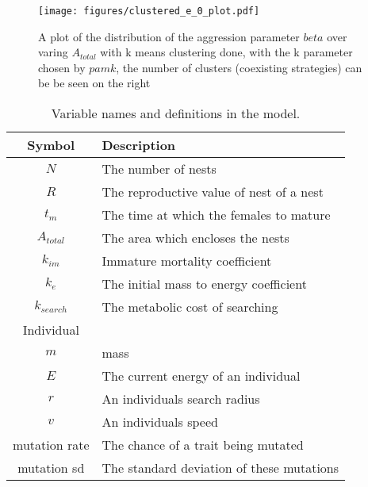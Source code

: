 \documentclass[a4paper,11pt]{article}
\begin{document}
\begin{figure}[h!]
    \centering
    \texttt{[image: figures/clustered\_e\_0\_plot.pdf]}
    \caption{A plot of the distribution of the aggression parameter $beta$ over varing $A_{total}$ with k means clustering done, with the k parameter chosen by $pamk$, the number of clusters (coexisting strategies) can be be seen on the right}
\end{figure}



\clearpage
\begin{table}[h!]
    \caption{Variable names and definitions in the model.}
    \centering
    \begin{tabular}{c | l }
        \hline
        Symbol & Description\\
        \hline
        \hline
        $N$ &  The number of nests \\
        $R$ &  The reproductive value of nest of a nest\\
        $t_m$  & The time at which the females to mature\\
        $A_{total}$ & The area which encloses the nests\\
        \hline
        $k_{im}$ & Immature mortality coefficient \\
        $k_e$ & The initial mass to energy coefficient \\
        $k_{search}$ & The metabolic cost of searching \\
        \hline
        Individual & \\
        \hline
        $m$ & mass\\
        $E$ & The current energy of an individual\\
        $r$ & An individuals search radius\\
        $v$ & An individuals speed\\ 
        \hline
        mutation rate & The chance of a trait being mutated\\
        mutation sd & The standard deviation of  these mutations\\
        \hline
    \end{tabular}
\end{table}


\end{document}
